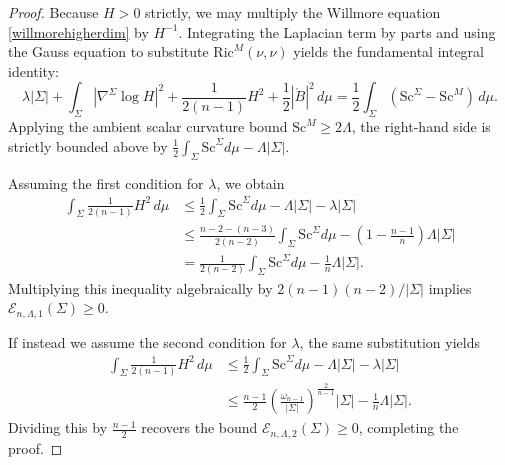 \documentclass[10pt,a4paper]{amsart}
\begin{document}
\begin{proof}
Because $H > 0$ strictly, we may multiply the Willmore equation \eqref{willmorehigherdim} by $H^{-1}$. Integrating the Laplacian term by parts and using the Gauss equation to substitute $\mathrm{Ric}^M(\nu, \nu)$ yields the fundamental integral identity:
\begin{equation}\label{willmoredived_unified}
\lambda |\Sigma | + \int_{\Sigma} |\nabla^{\Sigma} \log H|^2 + \frac{1}{2(n-1)} H^2 + \frac{1}{2} |\mathring{B}|^2 \, d\mu = \frac{1}{2} \int_{\Sigma } (\mathrm{Sc}^{\Sigma} - \mathrm{Sc}^M) \, d\mu.
\end{equation}
Applying the ambient scalar curvature bound $\mathrm{Sc}^M \ge 2\Lambda$, the right-hand side is strictly bounded above by $\frac{1}{2} \int_{\Sigma } \mathrm{Sc}^{\Sigma} d\mu - \Lambda|\Sigma|$. 

Assuming the first condition  for $\lambda$, we obtain
\begin{equation*}
\begin{split}
    \int_{\Sigma} \frac{1}{2(n-1)} H^2 \, d\mu &\leq \frac{1}{2} \int_{\Sigma} \mathrm{Sc}^{\Sigma} d\mu - \Lambda|\Sigma| - \lambda|\Sigma| \\
    &\leq \frac{n-2 - (n-3)}{2(n-2)} \int_{\Sigma} \mathrm{Sc}^{\Sigma} d\mu - \left(1 - \frac{n-1}{n}\right)\Lambda|\Sigma| \\
    &= \frac{1}{2(n-2)} \int_{\Sigma} \mathrm{Sc}^{\Sigma} d\mu - \frac{1}{n}\Lambda|\Sigma|.
\end{split}
\end{equation*}
Multiplying this inequality algebraically by $2(n-1)(n-2)/|\Sigma|$  implies $\mathcal{E}_{n,\Lambda,1}(\Sigma)\geq 0$.

If instead we assume the second condition  for $\lambda$, the same substitution yields
\begin{equation*}
\begin{split}
    \int_{\Sigma} \frac{1}{2(n-1)} H^2 \, d\mu &\leq \frac{1}{2} \int_{\Sigma} \mathrm{Sc}^{\Sigma} d\mu - \Lambda|\Sigma| - \lambda|\Sigma| \\
    &\leq \frac{n-1}{2} \left( \frac{\omega_{n-1}}{ |\Sigma|} \right)^{\frac{2}{n-1}}|\Sigma| - \frac{1}{n}\Lambda|\Sigma|.
\end{split}
\end{equation*}
Dividing this by $\frac{n-1}{2}$  recovers the bound $\mathcal{E}_{n,\Lambda,2}(\Sigma)\geq 0$, completing the proof.
\end{proof}
\end{document}
